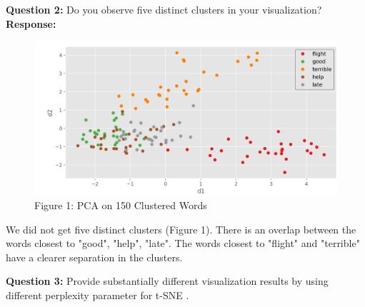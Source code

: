 \documentclass[12pt,article]{article}
\begin{document}
\newline

\textbf{Question 2:}\newline
Do you observe five distinct clusters in your visualization?\newline
\newpage
\textbf{Response:}

\begin{figure}[H]
\centering
\includegraphics[scale = 0.35]{images/PCA_clusters.png}    
\captionsetup{labelformat=empty}
\vspace{-5pt}
\caption{\scriptsize{\;\;\;\;\;\;\;\;\;\;\;\;\;Figure 1: PCA on 150 Clustered Words}}
\end{figure}

We did not get five distinct clusters (Figure 1). There is an overlap between the words closest to "good", "help", "late". The words closest to "flight" and "terrible" have a clearer separation in the clusters.\newline

\textbf{Question 3:}\newline
Provide substantially different visualization results by using different perplexity parameter for t-SNE .\newline
\end{document}

